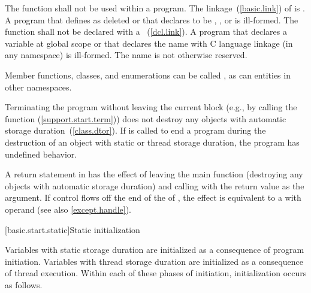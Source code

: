 \pnum
The function  shall not be used within
a program.
%
The linkage~(\ref{basic.link}) of  is
. A program that defines  as
deleted or that declares  to be
, , or  is ill-formed.
The  function shall not be declared with a
~(\ref{dcl.link}).  A program that
declares a variable  at global scope or that declares the name
 with C language linkage (in any namespace) is ill-formed.
The name  is
not otherwise reserved. \begin{example} Member functions, classes, and
enumerations can be called , as can entities in other
namespaces. \end{example}

\pnum
{}%
%
%
Terminating the program
without leaving the current block (e.g., by calling the function
 (\ref{support.start.term})) does not destroy any
objects with automatic storage duration~(\ref{class.dtor}). If
 is called to end a program during the destruction of
an object with static or thread storage duration, the program has undefined
behavior.

\pnum
{}%
%
A return statement in  has the effect of leaving the main
function (destroying any objects with automatic storage duration) and
calling  with the return value as the argument.
If control flows off the end of
the  of ,
the effect is equivalent to a  with operand 
(see also \ref{except.handle}).

[basic.start.static]{Static initialization}

\pnum
{}%
%
Variables with static storage duration
are initialized as a consequence of program initiation. Variables with
thread storage duration are initialized as a consequence of thread execution.
Within each of these phases of initiation, initialization occurs as follows.

